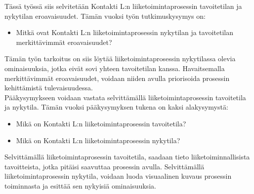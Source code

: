 \documentclass[finnish,12pt,a4paper,pdftex]{article}
\begin{document}
Tässä työssä siis selvitetään Kontakti L:n liiketoimintaprosessin tavoitetilan ja nykytilan eroavaisuudet. Tämän vuoksi työn tutkimuskysymys on:
\begin{itemize}
\item Mitkä ovat Kontakti L:n liiketoimintaprosessin nykytilan ja tavoitetilan merkittävimmät eroavaisuudet?
\end{itemize}

Tämän työn tarkoitus on siis löytää liiketoimintaprosessin nykytilassa olevia ominaisuuksia, jotka eivät sovi yhteen tavoitetilan kanssa. Havaitsemalla merkittävimmät eroavaisuudet, voidaan niiden avulla priorisoida prosessin kehittämistä tulevaisuudessa.\\

Pääkysymykseen voidaan vastata selvittämällä liiketoimintaprosessin tavoitetila ja nykytila. Tämän vuoksi pääkysymyksen tukena on kaksi alakysymystä:
\begin{itemize}
     \item Mikä on Kontakti L:n liiketoimintaprosessin tavoitetila?
     \item Mikä on Kontakti L:n liiketoimintaprosessin nykytila?
   \end{itemize}

Selvittämällä liiketoimintaprosessin tavoitetila, saadaan tieto liiketoiminnallisista tavoitteista, jotka pitäisi saavuttaa prosessin avulla. Selvittämällä liiketoimintaprosessin nykytila, voidaan luoda visuaalinen kuvaus prosessin toiminnasta ja esittää sen nykyisiä ominaisuuksia.




\end{document}
